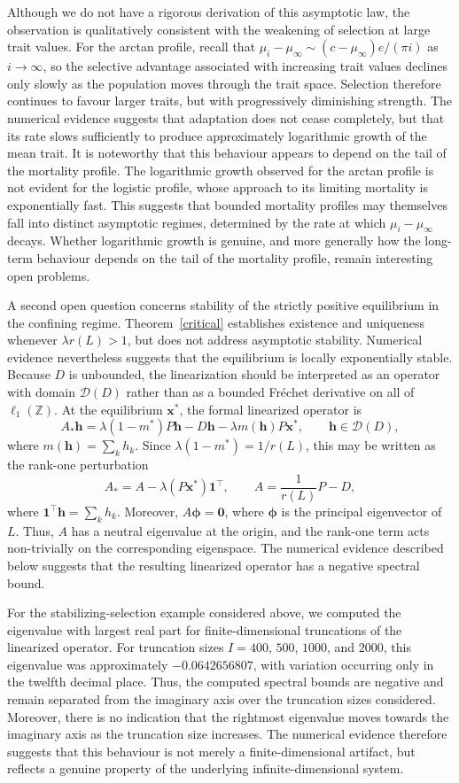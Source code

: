 \documentclass[12pt]{article}
\newcommand{\Z}{\ensuremath{\mathbb Z}}
\newcommand\D{\ensuremath{\mathcal{D}}}
\newcommand{\bh}{\boldsymbol{h}}
\newcommand{\bphi}{\boldsymbol{\phi}}
\newcommand{\BS}{\ensuremath{\ell_1(\Z)}}
\newcommand{\bzero}{\boldsymbol{0}}
\newcommand{\bx}{\boldsymbol{x}}
\begin{document}
Although we do not have a rigorous derivation of this asymptotic law,
the observation is qualitatively consistent with the weakening of
selection at large trait values. For the arctan profile, recall that
$\mu_i-\mu_\infty\sim(c-\mu_\infty)e/(\pi i)$ as $i\to\infty$, so the
selective advantage associated with increasing trait values declines
only slowly as the population moves through the trait space. Selection
therefore continues to favour larger traits, but with progressively
diminishing strength. The numerical evidence suggests that adaptation
does not cease completely, but that its rate slows sufficiently to
produce approximately logarithmic growth of the mean trait.
It is noteworthy that this behaviour appears to depend on the tail of
the mortality profile. The logarithmic growth observed for the arctan
profile is not evident for the logistic profile, whose approach to its
limiting mortality is exponentially fast. This suggests that bounded
mortality profiles may themselves fall into distinct asymptotic
regimes, determined by the rate at which
$\mu_i-\mu_\infty$ decays. Whether logarithmic growth is genuine, and
more generally how the long-term behaviour depends on the tail of the
mortality profile, remain interesting open problems.

A second open question concerns stability of the strictly positive
equilibrium in the confining regime. Theorem~\ref{critical} establishes
existence and uniqueness whenever $\lambda r(L)>1$, but does not
address asymptotic stability. Numerical evidence nevertheless suggests
that the equilibrium is locally exponentially stable.
Because $D$ is unbounded, the linearization should be interpreted as an
operator with domain $\D(D)$ rather than as a bounded Fr\'echet
derivative on all of $\BS$. At the equilibrium $\bx^*$, the formal
linearized operator is
$$
A_*\bh
=
\lambda(1-m^*)P\bh-D\bh
-\lambda m(\bh)P\bx^*,
\qquad
\bh\in\D(D),
$$
where $m(\bh)=\sum_kh_k$. Since
$\lambda(1-m^*)=1/r(L)$, this may be written as the rank-one
perturbation
$$
A_*
=
A-\lambda(P\bx^*)\boldsymbol{1}^{\top},
\qquad
A=\frac{1}{r(L)}P-D,
$$
where $\boldsymbol{1}^{\top}\bh=\sum_kh_k$. Moreover,
$A\bphi=\bzero$, where $\bphi$ is the principal eigenvector of $L$.
Thus, $A$ has a neutral eigenvalue at the origin, and the rank-one term
acts non-trivially on the corresponding eigenspace. The numerical
evidence described below suggests that the resulting linearized
operator has a negative spectral bound.

For the stabilizing-selection example considered above, we computed the
eigenvalue with largest real part for finite-dimensional truncations of
the linearized operator. For truncation sizes $I=400$, $500$, $1000$,
and $2000$, this eigenvalue was approximately $-0.0642656807$, with
variation occurring only in the twelfth decimal place. Thus, the
computed spectral bounds are negative and remain separated from the
imaginary axis over the truncation sizes considered. Moreover, there is
no indication that the rightmost eigenvalue moves towards the imaginary
axis as the truncation size increases. The numerical evidence therefore
suggests that this behaviour is not merely a finite-dimensional
artifact, but reflects a genuine property of the underlying
infinite-dimensional system.
\end{document}
